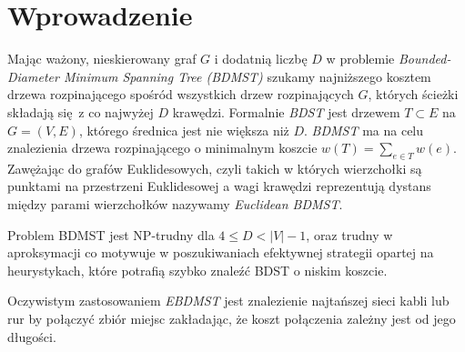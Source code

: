 \section{Wprowadzenie}
Mając ważony, nieskierowany graf $G$ i dodatnią liczbę $D$ w problemie \textit{Bounded-Diameter Minimum Spanning Tree (BDMST)} szukamy najniższego kosztem drzewa rozpinającego spośród wszystkich drzew rozpinających $G$, których ścieżki składają się z co najwyżej $D$ krawędzi. Formalnie \textit{BDST} jest drzewem $T \subset E$ na $G = (V, E)$, którego średnica jest nie większa niż $D$. \textit{BDMST} ma na celu znalezienia drzewa rozpinającego o minimalnym koszcie $w(T) = \sum_{e\in T} w(e)$. Zawężając do grafów Euklidesowych, czyli takich w których wierzchołki są punktami na przestrzeni Euklidesowej a wagi krawędzi reprezentują dystans między parami wierzchołków nazywamy \textit{Euclidean BDMST}.

Problem BDMST jest NP-trudny dla $4 \leq D < |V| - 1$, oraz trudny w aproksymacji co motywuje w poszukiwaniach efektywnej strategii opartej na heurystykach, które potrafią szybko znaleźć BDST o niskim koszcie.

Oczywistym zastosowaniem \textit{EBDMST} jest znalezienie najtańszej sieci kabli lub rur by połączyć zbiór miejsc zakładając, że koszt połączenia zależny jest od jego długości.

